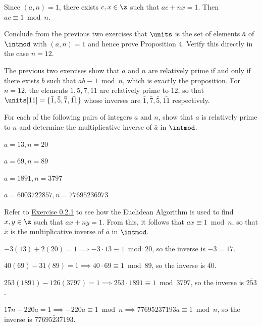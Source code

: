 \begin{sol}
    Since $(a, n) = 1$, there exists $c, x \in \z$ such that $ac + nx = 1$. Then $ac \equiv 1 \bmod n$.
\end{sol}

\begin{exercise}\label{ex0.3.14}
    Conclude from the previous two exercises that $\units$ is the set of elements $\bar a$ of $\intmod$ with $(a, n) = 1$ and hence prove Proposition 4. Verify this directly in the case $n = 12$.
\end{exercise}

\begin{sol}
    The previous two exercises show that $a$ and $n$ are relatively prime if and only if there exists $b$ such that $ab \equiv 1 \bmod n$, which is exactly the proposition. For $n = 12$, the elements $1, 5, 7, 11$ are relatively prime to $12$, so that $\units[11] = \{\bar 1, \bar 5, \bar 7, \bar{11}\} $ whose inverses are $\bar 1, \bar 7, \bar 5, \bar{11}$ respectively. 
\end{sol}

\begin{exercise}\label{ex0.3.15}
    For each of the following pairs of integers $a$ and $n$, show that $a$ is relatively prime to $n$ and determine the multiplicative inverse of $\bar a$ in $\intmod$.
    \begin{subproblems}
        \item $a = 13, n = 20$
        \item $a = 69, n = 89$
        \item $a = 1891, n = 3797$
        \item $a = 6003722857, n = 77695236973$
    \end{subproblems}
\end{exercise}

\begin{sol}
    Refer to \hyperref[ex0.2.1]{Exercise 0.2.1} to see how the Euclidean Algorithm is used to find $x, y \in \z$ such that $ax + ny = 1$. From this, it follows that $ax \equiv 1 \bmod n$, so that $\bar x$ is the multiplicative inverse of $\bar a$ in $\intmod$.
    \begin{subproblems}
        \item $-3(13) + 2(20) = 1 \implies -3 \cdot 13 \equiv 1 \bmod 20$, so the inverse is $\bar{-3} = \bar{17}$.
        \item $40(69) - 31(89) = 1 \implies 40 \cdot 69 \equiv 1 \bmod 89$, so the inverse is $\bar{40}$.
        \item $253(1891) - 126(3797) = 1 \implies 253 \cdot 1891 \equiv 1 \bmod 3797$, so the inverse is $\bar{253}$.
        \item $17n - 220a = 1 \implies -220a \equiv 1 \bmod n \implies 77695237193a \equiv 1 \bmod n$, so the inverse is $\bar{77695237193}$. \qh
    \end{subproblems}
\end{sol}

